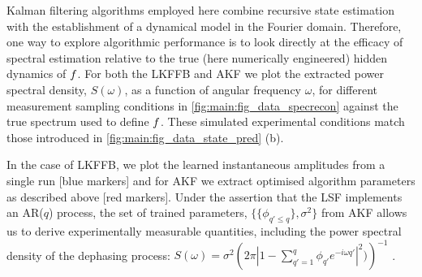 Kalman filtering algorithms employed here combine recursive state estimation with the establishment of a dynamical model in the Fourier domain.  Therefore, one way to explore algorithmic performance is to look directly at the efficacy of spectral estimation relative to the true (here numerically engineered) hidden dynamics of $f$.  For both the LKFFB and AKF we plot the extracted power spectral density, $S(\omega)$, as a function of angular frequency $\omega$, for different measurement sampling conditions in \cref{fig:main:fig_data_specrecon} against the true spectrum used to define $f$.  These simulated experimental conditions match those introduced in \cref{fig:main:fig_data_state_pred} (b). 

In the case of LKFFB, we plot the learned instantaneous amplitudes from a single run [blue markers] and for AKF we extract optimised algorithm parameters as described above [red markers]. Under the assertion that the LSF implements an AR($q$) process, the set of trained parameters, $\{  \{\phi_{q' \leq q}\}, \sigma^2\}$ from AKF allows us to derive experimentally measurable quantities, including the power spectral density of the dephasing process: $S(\omega) = \sigma^2 \left(2 \pi |1 - \sum_{q'=1}^q \phi_{q'} e^{-i\omega q'}|^2)\right)^{-1} $ \cite{brockwell1996introduction}. %

